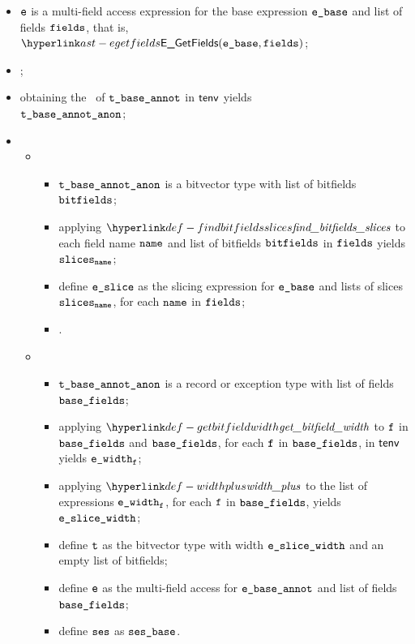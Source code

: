 \ProseParagraph
\AllApply
\begin{itemize}
  \item $\texttt{e}$ is a multi-field access expression for the base expression $\ebase$ and list of fields $\texttt{fields}$,
        that is, $\EGetFields(\ebase, \vfields)$;
  \item \Proseannotateexpr{$\tenv$}{$\ebase$}{\\ $(\tbaseannot, \vetwo, \vsesbase)$}\ProseOrTypeError;
  \item obtaining the \underlyingtype\ of $\texttt{t\_base\_annot}$ in $\tenv$ yields \\
        $\texttt{t\_base\_annot\_anon}$\ProseOrTypeError;
  \item \OneApplies
  \begin{itemize}
    \item {}
    \begin{itemize}
      \item $\texttt{t\_base\_annot\_anon}$ is a bitvector type with list of bitfields $\texttt{bitfields}$\ProseOrTypeError;
      \item applying $\findbitfieldsslices$ to each field name $\texttt{name}$ and list of bitfields $\texttt{bitfields}$ in $\texttt{fields}$ yields \\
            $\texttt{slices}_{\texttt{name}}$\ProseOrTypeError;
      \item define $\veslice$ as the slicing expression for $\ebase$ and lists of slices $\texttt{slices}_{\texttt{name}}$, for each $\texttt{name}$ in $\texttt{fields}$;
      \item \Proseannotateexpr{$\tenv$}{$\veslice$}{\\ $(\vt, \newe, \vses)$}\ProseOrTypeError.
    \end{itemize}

    \item {}
    \begin{itemize}
      \item $\texttt{t\_base\_annot\_anon}$ is a record or exception type with list of fields $\texttt{base\_fields}$\ProseOrTypeError;
      \item applying $\getbitfieldwidth$ to $\texttt{f}$ in $\texttt{base\_fields}$ and $\texttt{base\_fields}$, for each $\texttt{f}$ in $\texttt{base\_fields}$, in $\tenv$ yields $\texttt{e\_width}_{\texttt{f}}$\ProseOrTypeError;
      \item applying $\widthplus$ to the list of expressions $\texttt{e\_width}_{\texttt{f}}$,
            for each $\texttt{f}$ in $\texttt{base\_fields}$, yields $\texttt{e\_slice\_width}$\ProseOrTypeError;
      \item define $\texttt{t}$ as the bitvector type with width $\texttt{e\_slice\_width}$ and an empty list of bitfields;
      \item define $\texttt{e}$ as the multi-field access for $\texttt{e\_base\_annot}$ and list of fields \\
            $\texttt{base\_fields}$;
      \item define $\texttt{ses}$ as $\texttt{ses\_base}$.
    \end{itemize}


\end{itemize}
\end{itemize}
